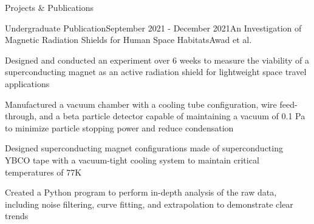 \documentclass{resume} %
\begin{document}
\begin{rSection}{Projects \& Publications}

\begin{rSubsection}{Undergraduate Publication}{September 2021 - December 2021}{An Investigation of Magnetic Radiation Shields for Human Space Habitats}{Awad et al.}
\item Designed and conducted an experiment over 6 weeks to measure the viability of a superconducting magnet as an active radiation shield for lightweight space travel applications
\item Manufactured a vacuum chamber with a cooling tube configuration, wire feed-through, and a beta particle detector capable of maintaining a vacuum of 0.1 Pa to minimize particle stopping power and reduce condensation
\item Designed superconducting magnet configurations made of superconducting YBCO tape with a vacuum-tight cooling system to maintain critical temperatures of 77K
\item Created a Python program to perform in-depth analysis of the raw data, including noise filtering, curve fitting, and extrapolation to demonstrate clear trends

\end{rSubsection}

\begin{comment}
\begin{rSubsection}{Co-Founder, PolyTwist Designs}{November 2015 - Present}{\url{www.polytwist.xyz}}{}
\item Co-founded a small business designing and manufacturing original Rubik's-Cube-style puzzles with unique mechanisms, challenges, and solutions using FDM 3D Printing and SolidWorks
\item Designed and manufactured several novel products end-to-end resulting in 16+ original designs
\item Created and maintained a website and online shop resulting in \$20,000 in sales of 16+ products over three years
\item Negotiated a partnership with Rubik's Brand Ltd. to mass-produce a product, involving the design stages to manufacturing through injection molding and packaging design

\end{rSubsection}
\end{comment}

\end{rSection}

\end{document}
